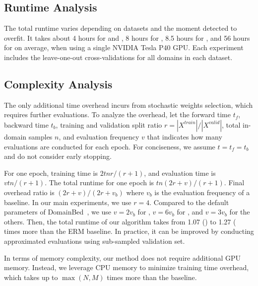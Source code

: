 \subsection{Runtime Analysis}

The total runtime varies depending on datasets and the moment detected to overfit. It takes about 4 hours for  and , 8 hours for , 8.5 hours for , and 56 hours for  on average, when using a single NVIDIA Tesla P40 GPU. Each experiment includes the leave-one-out cross-validations for all domains in each dataset.

\subsection{Complexity Analysis}

The only additional time overhead incurs from stochastic weights selection, which requires further evaluations.
To analyze the overhead, let the forward time $t_f$, backward time $t_b$, training and validation split ratio $r=|X^{train}|/|X^{valid}|$, total in-domain samples $n$, and evaluation frequency $v$ that indicates how many evaluations are conducted for each epoch. For conciseness, we assume $t=t_f=t_b$ and do not consider early stopping.

For one epoch, training time is $2tnr/(r+1)$, and evaluation time is $vtn/(r+1)$. The total runtime for one epoch is $tn(2r+v)/(r+1)$. Final overhead ratio is $(2r+v)/(2r+v_b)$ where $v_b$ is the evaluation frequency of a baseline. In our main experiments, we use $r=4$. Compared to the default parameters of DomainBed~\cite{gulrajani2020domainbed}, we use $v=2v_b$ for , $v=6v_b$ for , and $v=3v_b$ for the others. Then, the total runtime of our algorithm takes from 1.07 () to 1.27 ( times more than the ERM baseline. In practice, it can be improved by conducting approximated evaluations using sub-sampled validation set.


In terms of memory complexity, our method does not require additional GPU memory. Instead, we leverage CPU memory to minimize training time overhead, which takes up to $\max (N, M)$ times more than the baseline.

